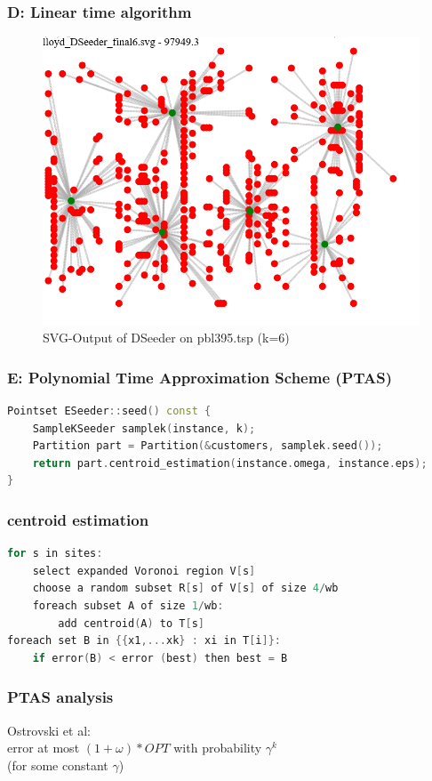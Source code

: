 \documentclass{beamer}
\begin{document}
\begin{frame}[fragile]
\frametitle{D: Linear time algorithm}
\begin{figure}[ht]
	\centering
	\includegraphics[scale=0.4]{DSeeder_pbl395.PNG}
	\caption{SVG-Output of DSeeder on pbl395.tsp (k=6)}
\end{figure}
\end{frame}

  
\begin{frame}[fragile]
    \frametitle{E: Polynomial Time Approximation Scheme (PTAS)}
\begin{lstlisting}[language=C++]
Pointset ESeeder::seed() const {
	SampleKSeeder samplek(instance, k);
	Partition part = Partition(&customers, samplek.seed());
	return part.centroid_estimation(instance.omega, instance.eps);
}
\end{lstlisting}
\end{frame}


\begin{frame}[fragile]
\frametitle{centroid estimation}
\begin{lstlisting}[language=C++]
for s in sites:
    select expanded Voronoi region V[s]
    choose a random subset R[s] of V[s] of size 4/wb
    foreach subset A of size 1/wb:
        add centroid(A) to T[s]
foreach set B in {{x1,...xk} : xi in T[i]}:
    if error(B) < error (best) then best = B
\end{lstlisting}
\end{frame}

\begin{frame}[fragile]
\frametitle{PTAS analysis}
Ostrovski et al:\\ 
error at most $(1+\omega)*OPT$ with probability $\gamma^k$\\ 
(for some constant $\gamma$)
\end{frame}
\end{document}
